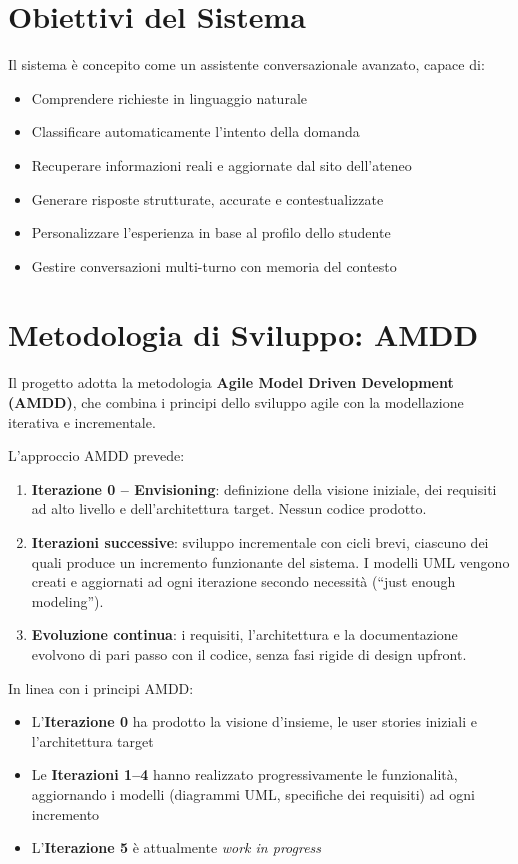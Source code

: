 \documentclass[a4paper,12pt]{report}
\begin{document}
\section{Obiettivi del Sistema}

Il sistema è concepito come un assistente conversazionale avanzato, capace di:
\begin{itemize}
    \item Comprendere richieste in linguaggio naturale
    \item Classificare automaticamente l'intento della domanda
    \item Recuperare informazioni reali e aggiornate dal sito dell'ateneo
    \item Generare risposte strutturate, accurate e contestualizzate
    \item Personalizzare l'esperienza in base al profilo dello studente
    \item Gestire conversazioni multi-turno con memoria del contesto
\end{itemize}

\section{Metodologia di Sviluppo: AMDD}

Il progetto adotta la metodologia \textbf{Agile Model Driven Development (AMDD)}, che combina i principi dello sviluppo agile con la modellazione iterativa e incrementale.

L'approccio AMDD prevede:
\begin{enumerate}
    \item \textbf{Iterazione 0 -- Envisioning}: definizione della visione iniziale, dei requisiti ad alto livello e dell'architettura target. Nessun codice prodotto.
    \item \textbf{Iterazioni successive}: sviluppo incrementale con cicli brevi, ciascuno dei quali produce un incremento funzionante del sistema. I modelli UML vengono creati e aggiornati ad ogni iterazione secondo necessità (``just enough modeling'').
    \item \textbf{Evoluzione continua}: i requisiti, l'architettura e la documentazione evolvono di pari passo con il codice, senza fasi rigide di design upfront.
\end{enumerate}

In linea con i principi AMDD:
\begin{itemize}
    \item L'\textbf{Iterazione 0} ha prodotto la visione d'insieme, le user stories iniziali e l'architettura target
    \item Le \textbf{Iterazioni 1--4} hanno realizzato progressivamente le funzionalità, aggiornando i modelli (diagrammi UML, specifiche dei requisiti) ad ogni incremento
    \item L'\textbf{Iterazione 5} è attualmente \textit{work in progress}
\end{itemize}
\end{document}

